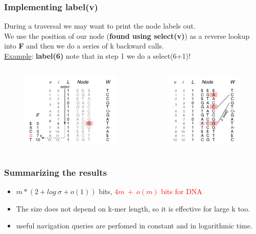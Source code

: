 \begin{frame}
\frametitle{Implementing label(v)}
During a traversal we may want to print the node labels out.
\\
We use the position of our node (\textbf{found using select(v)}) as a reverse lookup into \textbf{F} and then we do a series of k backward calls.
\\ \medskip
\underline{Example}: \textbf{label(6)} 
note that in step 1 we do a select(6+1)!
  \begin{columns}
	  \begin{figure}
	  \includegraphics[scale=0.4]{img/label1.png}
	  \end{figure}
      \begin{figure}
	   \includegraphics[scale=0.4]{img/label2.png}
      \end{figure}
  \end{columns}
\end{frame}

\begin{frame}
\frametitle{Summarizing the results}
\begin{itemize}
	\item $ m*(2+log\ \sigma +o(1))$ bits, \textcolor{red}{$4m\ +\ o(m)$ bits for DNA}
	\item The size does not depend on k-mer length, so it is effective for large k too.
	\item useful navigation queries are perfomed in constant and in logarithmic time.
\end{itemize}
\end{frame}
